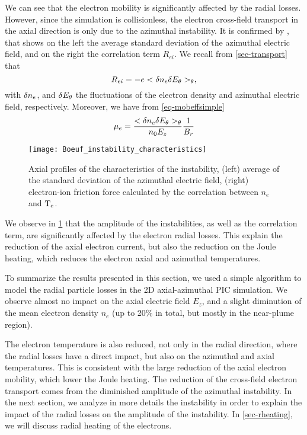     We can see that the electron mobility is significantly affected by the radial losses.
    However, since the simulation is collisionless, the electron cross-field transport in the axial direction is only due to the azimuthal instability.
    It is confirmed by , that shows on the left the average standard deviation of the azimuthal electric field, and on the right the correlation term $R_{ei}$.
    We recall from \cref{sec-transport} that 
    \begin{equation} \label{eq-rei}
      R_{ei} =  - e < \delta n_e \delta E_{\theta} >_{\theta},
    \end{equation}
    with $\delta n_e$, and $\delta E_{\theta}$ the fluctuations of the electron density and azimuthal electric field, respectively.
    Moreover, we have from \cref{eq-mobeffsimple}
    \begin{equation*}
      \mu_e = \frac{< \delta n_e \delta E_{\theta} >_{\theta} }{n_0 E_z}   \frac{1}{B_r}
    \end{equation*}


    \begin{figure}[!hbt]
      \centering
      \texttt{[image: Boeuf\_instability\_characteristics]}
      \caption{Axial profiles of the characteristics of the instability, (left) average of the standard deviation of the azimuthal electric field, (right) electron-ion friction force calculated by the correlation between $n_e$ and $\mathrm{T_e}$.    }
      \label{fig-boeuf-instability}
    \end{figure}

    
    We observe in \cref{fig-boeuf-instability} that the amplitude of the instabilities, as well as the correlation term, are significantly affected by the electron radial losses.
    This explain the reduction of the axial electron current, but also the reduction on the Joule heating, which reduces the electron axial and azimuthal temperatures.

    \vspace{1em}
    To summarize the results presented in this section, we used a simple algorithm to model the radial particle losses in the \ac{2D} axial-azimuthal \ac{PIC} simulation.
    We observe almost no impact on the axial electric field $E_z$, and a slight diminution of the mean electron density $n_e$ (up to 20\% in total, but mostly in the near-plume region).
    
    The electron temperature is also reduced, not only in the radial direction, where the radial losses have a direct impact, but also on the azimuthal and axial temperatures.
    This is consistent with the large reduction of the axial electron mobility, which lower the Joule heating.
    The reduction of the cross-field electron transport comes from the diminished amplitude of the azimuthal instability.
    In the next section, we analyze in more details the instability in order to explain the impact of the radial losses on the amplitude of the instability.
    In \cref{sec-rheating}, we will discuss radial heating of the electrons.


\afterpage{\clearpage}
